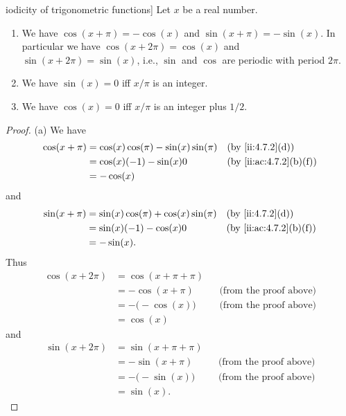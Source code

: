\begin{thm}iodicity of trigonometric functions]\label{ii:4.7.5}
  Let \(x\) be a real number.
  \begin{enumerate}
    \item We have \(\cos(x + \pi) = -\cos(x)\) and \(\sin(x + \pi) = -\sin(x)\).
          In particular we have \(\cos(x + 2\pi) = \cos(x)\) and \(\sin(x + 2\pi) = \sin(x)\), i.e., \(\sin\) and \(\cos\) are periodic with period \(2\pi\).
    \item We have \(\sin(x) = 0\) iff \(x / \pi\) is an integer.
    \item We have \(\cos(x) = 0\) iff \(x / \pi\) is an integer plus \(1 / 2\).
  \end{enumerate}
\end{thm}

\begin{proof}{(a)}
  We have
  \begin{align*}
    \cos(x + \pi) & = \cos(x) \cos(\pi) - \sin(x) \sin(\pi) &  & \by{ii:4.7.2}[d]      \\
                  & = \cos(x) (-1) - \sin(x) 0              &  & \by{ii:ac:4.7.2}[b,f] \\
                  & = -\cos(x)
  \end{align*}
  and
  \begin{align*}
    \sin(x + \pi) & = \sin(x) \cos(\pi) + \cos(x) \sin(\pi) &  & \by{ii:4.7.2}[d]      \\
                  & = \sin(x) (-1) - \cos(x) 0              &  & \by{ii:ac:4.7.2}[b,f] \\
                  & = -\sin(x).
  \end{align*}
  Thus
  \begin{align*}
    \cos(x + 2\pi) & = \cos(x + \pi + \pi)                                    \\
                   & = -\cos(x + \pi)      &  & \text{(from the proof above)} \\
                   & = -\big(-\cos(x)\big) &  & \text{(from the proof above)} \\
                   & = \cos(x)
  \end{align*}
  and
  \begin{align*}
    \sin(x + 2\pi) & = \sin(x + \pi + \pi)                                    \\
                   & = -\sin(x + \pi)      &  & \text{(from the proof above)} \\
                   & = -\big(-\sin(x)\big) &  & \text{(from the proof above)} \\
                   & = \sin(x).
  \end{align*}
\end{proof}

